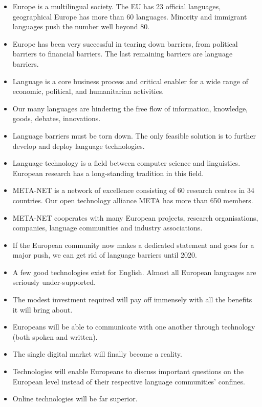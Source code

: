 \documentclass[10pt, plain]{../../metanetpaper}
\begin{document}
\vspace*{-6mm}
\begin{multicols}{2}
  \begin{itemize}
  \item Europe is a multilingual society. The EU has 23 official languages, geographical Europe has more than 60 languages. Minority and immigrant languages push the number well beyond 80.
  \item Europe has been very successful in tearing down barriers, from political barriers to financial barriers. The last remaining barriers are language barriers.
  \item Language is a core business process and critical enabler for a wide range of economic, political, and humanitarian activities.
  \item Our many languages are hindering the free flow of information, knowledge, goods, debates, innovations. 
  \item Language barriers must be torn down. The only feasible solution is to further develop and deploy language technologies.
  \item Language technology is a field between computer science and linguistics. European research has a long-standing tradition in this field.
  \item META-NET is a network of excellence consisting of 60 research centres in 34 countries. Our open technology alliance META has more than 650 members.
  \item META-NET cooperates with many European projects, research organisations, companies, language communities and industry associations.
  \item If the European community now makes a dedicated statement and goes for a major push, we can get rid of language barriers until 2020.
  \item A few good technologies exist for English. Almost all European languages are seriously under-supported.
  \item The modest investment required will pay off immensely with all the benefits it will bring about.
  \item Europeans will be able to communicate with one another through technology (both spoken and written).
  \item The single digital market will finally become a reality.
  \item Technologies will enable Europeans to discuss important questions on the European level instead of their respective language communities' confines.
  \item Online technologies will be far superior.

\end{itemize}
\end{multicols}
\end{document}
